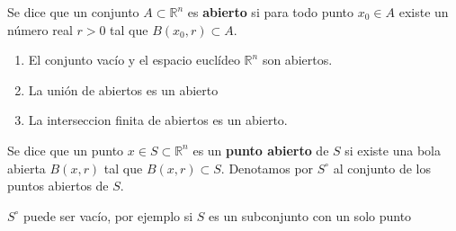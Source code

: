 \begin{definición}
    Se dice que un conjunto $A \subset \mathbb{R}^n$ es \textbf{abierto} si para todo punto $x_0 \in A$ existe un número real $r > 0$ tal que $B(x_0, r) \subset A$.
\end{definición}

\begin{proposición}
    \begin{enumerate}
        \item El conjunto vacío y el espacio euclídeo $\mathbb{R}^n$ son abiertos.
        \item La unión de abiertos es un abierto
        \item La interseccion finita de abiertos es un abierto.
    \end{enumerate}
\end{proposición}

\begin{definición}
    Se dice que un punto $x \in S \subset \mathbb{R}^n$ es un \textbf{punto abierto} de $S$ si existe una bola abierta $B(x, r)$ tal que $B(x, r) \subset S$. Denotamos por $S^\circ$ al conjunto de los puntos abiertos de $S$.
\end{definición}

\begin{observación}
    $S^\circ$ puede ser vacío, por ejemplo si $S$ es un subconjunto con un solo punto
\end{observación}

